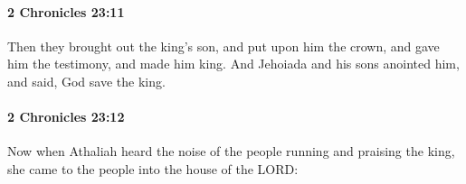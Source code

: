 		\paragraph{2 Chronicles 23:11} %
			\label{2CHRONICLES-23-11}

			Then they brought out the king's son, and put upon him the crown, and gave him the testimony, and made him king. And Jehoiada and his sons anointed him, and said, God save the king.


		\paragraph{2 Chronicles 23:12} %
			\label{2CHRONICLES-23-12}

			Now when Athaliah heard the noise of the people running and praising the king, she came to the people into the house of the LORD:


